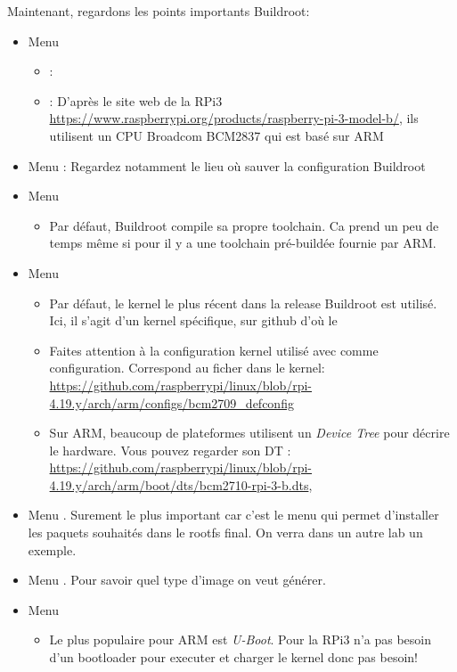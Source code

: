 Maintenant, regardons les points importants Buildroot:
\begin{itemize}
\item Menu 
  \begin{itemize}
  \item {} : 
  \item {} : D'après le site web de la
    RPi3 \url{https://www.raspberrypi.org/products/raspberry-pi-3-model-b/},
    ils utilisent un CPU Broadcom BCM2837 qui est basé sur ARM 
  \end{itemize}
\item Menu  : Regardez notamment le lieu où sauver la
  configuration Buildroot
\item Menu 
  \begin{itemize}
  \item Par défaut, Buildroot compile sa propre toolchain. Ca prend un peu
    de temps même si pour  il y a une toolchain pré-buildée fournie par
    ARM.%
  \end{itemize}
\item Menu 
  \begin{itemize}
  \item Par défaut, le kernel le plus récent dans la release Buildroot est
    utilisé. Ici, il s'agit d'un kernel spécifique, sur github d'où le
  \item Faites attention à la configuration kernel utilisé
     avec  comme
    configuration. Correspond au ficher  dans le
    kernel: \url{https://github.com/raspberrypi/linux/blob/rpi-4.19.y/arch/arm/configs/bcm2709_defconfig}
  \item Sur ARM, beaucoup de plateformes utilisent un {\em Device Tree} pour
    décrire le hardware. Vous pouvez regarder son DT :
    \url{https://github.com/raspberrypi/linux/blob/rpi-4.19.y/arch/arm/boot/dts/bcm2710-rpi-3-b.dts},
  \end{itemize}

\item Menu . Surement le plus important
  car c'est le menu qui permet d'installer les paquets souhaités dans
  le rootfs final. On verra dans un autre lab un exemple.
\item Menu . Pour savoir quel type d'image on veut
  générer.
\item Menu 
  \begin{itemize}
  \item Le plus populaire pour ARM est {\em U-Boot}. Pour la RPi3 n'a pas
    besoin d'un bootloader pour executer et charger le kernel donc pas besoin!
  \end{itemize}

\end{itemize}

